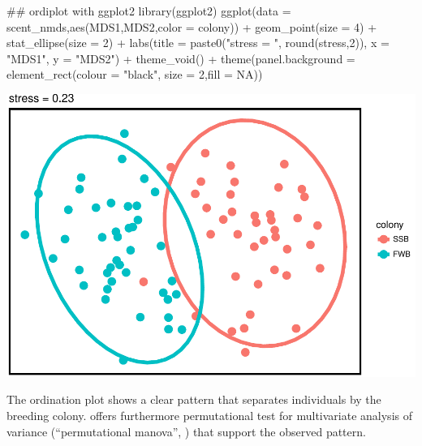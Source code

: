 \begin{Schunk}
\begin{Sinput}
## ordiplot with ggplot2
library(ggplot2)
ggplot(data = scent_nmds,aes(MDS1,MDS2,color = colony)) +
    geom_point(size = 4) + 
    stat_ellipse(size = 2) + 
    labs(title = paste0("stress = ", round(stress,2)), x = "MDS1", y = "MDS2") +  
    theme_void() + 
    theme(panel.background = element_rect(colour = "black", size = 2,fill = NA))
\end{Sinput}


\begin{center}\includegraphics{ottensmann-stoffel-hoffman_files/figure-latex/unnamed-chunk-11-1} \end{center}

\end{Schunk}

The ordination plot shows a clear pattern that separates individuals by
the breeding colony.  offers furthermore permutational test
for multivariate analysis of variance (``permutational manova'',
\citep{Anderson.2001}) that support the observed pattern.

